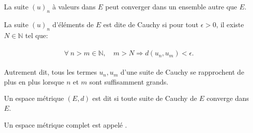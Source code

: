 \documentclass[letterpaper,11pt,english]{sphinxmanual}
\begin{document}
\begin{DUlineblock}{0em}
\item[]  La suite \((u)_n\) à valeurs dans \(E\) peut converger
dans un ensemble autre que \(E\).
\item[]  La suite \((u)_n\) d’éléments de \(E\) est
dite de Cauchy si pour tout \(\epsilon>0\), il existe
\(N\in\mathbb{N}\) tel que:
\end{DUlineblock}
\begin{equation}\label{equation:chapter2:chapter2:25}
\begin{split}\begin{aligned}
    \forall\  n>m \in \mathbb{N},\quad m>N \Longrightarrow d(u_n, u_m)<\epsilon.\end{aligned}\end{split}
\end{equation}
\begin{DUlineblock}{0em}
\item[] Autrement dit, tous les termes \(u_n, u_m\) d’une suite de Cauchy
se rapprochent de plus en plus lorsque \(n\) et \(m\) sont
suffisamment grands.
\item[] 
\item[]  Un espace métrique \((E,d)\) est dit 
si toute suite de Cauchy de \(E\) converge dans \(E\).
\item[] Un espace métrique complet est appelé .
\end{DUlineblock}
\end{document}
